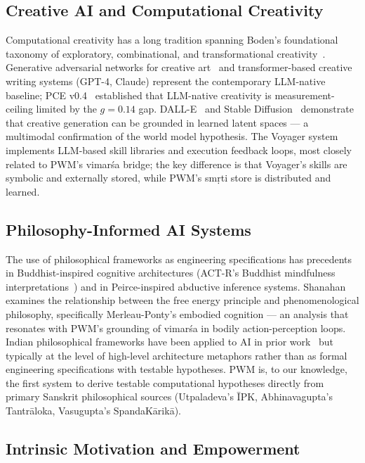 \documentclass[journal,onecolumn,11pt]{IEEEtran}
\begin{document}
\subsection{Creative AI and Computational Creativity}

Computational creativity has a long tradition spanning Boden's foundational
taxonomy of exploratory, combinational, and transformational
creativity~\cite{boden2004creative}.
Generative adversarial networks for creative art~\cite{goodfellow2014generative}
and transformer-based creative writing systems (GPT-4, Claude) represent the
contemporary LLM-native baseline; PCE v0.4~\cite{pce2024} established that
LLM-native creativity is measurement-ceiling limited by the $g{=}0.14$ gap.
DALL-E~\cite{ramesh2021zero} and Stable Diffusion~\cite{rombach2022high}
demonstrate that creative generation can be grounded in learned latent spaces
— a multimodal confirmation of the world model hypothesis.
The Voyager system~\cite{wang2023voyager} implements LLM-based skill libraries
and execution feedback loops, most closely related to PWM's vimarśa bridge;
the key difference is that Voyager's skills are symbolic and externally stored,
while PWM's smṛti store is distributed and learned.

\subsection{Philosophy-Informed AI Systems}

The use of philosophical frameworks as engineering specifications has precedents
in Buddhist-inspired cognitive architectures (ACT-R's Buddhist mindfulness
interpretations~\cite{anderson2004integrated}) and in Peirce-inspired abductive
inference systems.
Shanahan~\cite{shanahan2010embodiment} examines the relationship between the
free energy principle and phenomenological philosophy, specifically Merleau-Ponty's
embodied cognition — an analysis that resonates with PWM's grounding of
vimarśa in bodily action-perception loops.
Indian philosophical frameworks have been applied to AI in prior
work~\cite{rao2021sankhya} but typically at the level of high-level architecture
metaphors rather than as formal engineering specifications with testable hypotheses.
PWM is, to our knowledge, the first system to derive testable computational
hypotheses directly from primary Sanskrit philosophical sources
(Utpaladeva's ĪPK, Abhinavagupta's Tantrāloka, Vasugupta's SpandaKārikā).

\subsection{Intrinsic Motivation and Empowerment}
\end{document}

